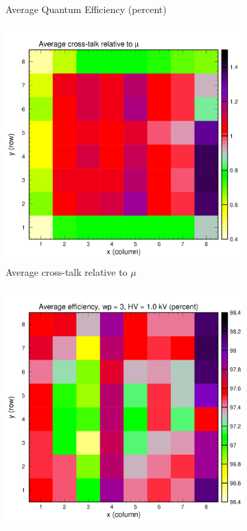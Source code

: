 \begin{figure}[hbt]
\begin{subfigure}[c]{0.24\linewidth}
		\caption{Average Quantum Efficiency (percent)}
		\vspace{0mm}
	\end{subfigure}%
	\vspace{3mm}
	\begin{subfigure}[c]{0.24\linewidth}
		\centering
		\includegraphics[width=\linewidth, trim={0mm 0mm 0mm 19mm},clip]{figures/pglobal_beta.pdf}
		\caption{Average cross-talk relative to $\mu$}
		\vspace{0mm}
	\end{subfigure}%
	\begin{subfigure}[c]{0.24\linewidth}
		\centering
		\includegraphics[width=\linewidth, trim={0mm 0mm 0mm 19mm},clip]{figures/pglobal_eff2d.pdf}

\end{subfigure}
\end{figure}
